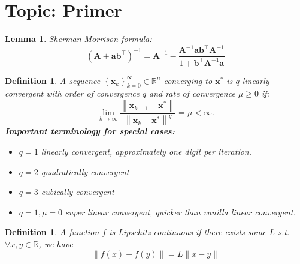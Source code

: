\documentclass[11pt]{article}
\theoremstyle{plain} %
\newtheorem{lemma}[theorem]{Lemma}
\newtheorem{definition}[theorem]{Definition}
\theoremstyle{remark}
\begin{document}
\begin{center}

  {}
\end{center}
\vspace{2em}

\tableofcontents

\section*{Topic: Primer}
\begin{lemma}\label{lemma: Sherman-Morrison}
  Sherman-Morrison formula:
  $$
    \left(\mathbf{A} + \mathbf{a} \mathbf{b}^{\top}\right)^{-1} = \mathbf{A}^{-1} - \frac{\mathbf{A}^{-1} \mathbf{a} \mathbf{b}^{\top} \mathbf{A}^{-1}}{1 + \mathbf{b}^{\top} \mathbf{A}^{-1} \mathbf{a}}
  $$
\end{lemma}

\begin{definition}
  A sequence $\left\{\mathbf{x}_k\right\}_{k=0}^{\infty} \in \mathbb{R}^n$ converging to $\mathbf{x}^*$ is $q$-linearly convergent with order of convergence $q$ and rate of convergence $\mu \ge 0$ if:
  $$
    \lim _{k \rightarrow \infty} \frac{\left\|\mathbf{x}_{k+1}-\mathbf{x}^*\right\|}{\left\|\mathbf{x}_k-\mathbf{x}^*\right\|^q}=\mu<\infty .
  $$
  \textbf{Important terminology for special cases:}
  \begin{itemize}
    \item $q=1$ \textit{linearly convergent}, approximately one digit per iteration.
    \item $q=2$ \textit{quadratically convergent}
    \item $q=3$ \textit{cubically convergent}
    \item $q=1, \mu=0$ \textit{super linear convergent}, quicker than vanilla linear convergent.
  \end{itemize}
\end{definition}

\begin{definition}
  A function $f$ is Lipschitz continuous if there exists some $L$ s.t. $\forall x, y \in \mathbb{R}$, we have
  $$
    \|f(x)-f(y)\|=L\|x-y\|
  $$
\end{definition}
\end{document}

